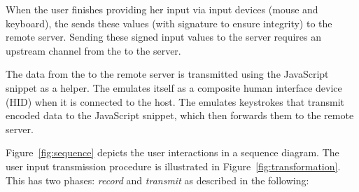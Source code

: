 When the user finishes providing her input via input devices (mouse and keyboard), the \device sends these values (with signature to ensure integrity) to the remote server. Sending these signed input values to the server requires an upstream channel from the \device to the server. 

\parasave
{}\label{sec:systemDesign:commit:upload} 
The data from the \device to the remote server is transmitted using the \name JavaScript snippet as a helper. 
The \device emulates itself as a composite human interface device (HID) when it is connected to the host. The \device emulates keystrokes that transmit encoded data to the \name JavaScript snippet, which then forwards them to the remote server.

\parasave
{} Figure~\ref{fig:sequence} depicts the user interactions in a sequence diagram. The user input transmission procedure is illustrated in Figure~\ref{fig:transformation}. This has two phases: \emph{record} and \emph{transmit} as described in the following:

